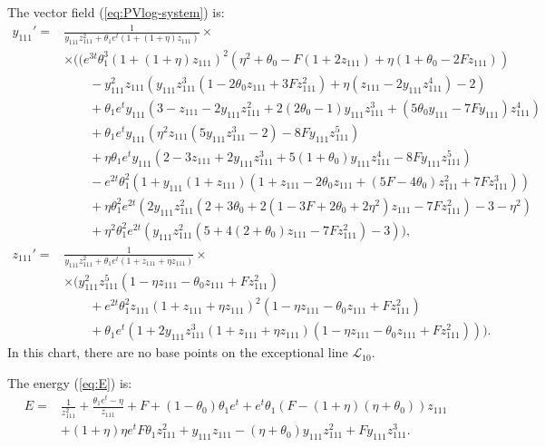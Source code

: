 The vector field  (\ref{eq:PVlog-system}) is:
$$
\begin{aligned}
y_{111}'=&\frac{1}{y_{111} z_{111}^2 + \theta_1 e^t (1 + (1+\eta) z_{111})}
\times
\\&
\times
\big(
(e^{3t} \theta_1^3 (1 + (1+\eta) z_{111})^2 (\eta^2 + \theta_0 - 
     F (1 + 2 z_{111}) + \eta (1 + \theta_0 - 2 F z_{111})) 
\\&
\qquad     
     - 
  y_{111}^2 z_{111} ( y_{111} z_{111}^3 (1 - 2 \theta_0 z_{111} + 3 F z_{111}^2) + 
     \eta (z_{111} - 2 y_{111} z_{111}^4)-2) 
 \\&
\qquad      
     + 
  \theta_1 e^t y_{111} (3 - z_{111} - 2 y_{111} z_{111}^2 
  + 
     2 (2 \theta_0-1) y_{111} z_{111}^3 + ( 5 \theta_0 y_{111}-7 F y_{111}) z_{111}^4)
\\&
 \qquad
+ \theta_1 e^t y_{111} (
         \eta^2 z_{111} (5 y_{111} z_{111}^3-2)  - 
     8 F y_{111} z_{111}^5)
\\&
 \qquad
+\eta \theta_1 e^t y_{111} (
     2 - 3 z_{111} + 2 y_{111} z_{111}^3 + 5 (1 + \theta_0) y_{111} z_{111}^4 - 
        8 F y_{111} z_{111}^5) 
\\&
 \qquad        
        -
  e^{2t} \theta_1^2 (1+ 
     y_{111} (1 + z_{111}) (1 + z_{111} - 
        2 \theta_0 z_{111} + (5 F - 4 \theta_0) z_{111}^2 + 7 F z_{111}^3))
\\&
 \qquad        
       +
 \eta  \theta_1^2 e^{2t}(
        2 y_{111} z_{111}^2 (2 + 3 \theta_0 + 2(1-3F+2 \theta_0+2\eta^2) z_{111} - 
           7 F z_{111}^2)-3-\eta^2)
 \\&
 \qquad        
       +
 \eta^2\theta_1^2 e^{2t}                   
      ( y_{111} z_{111}^2 (5 + 4 (2 + \theta_0) z_{111} - 7 F z_{111}^2)-3)
\big)
 ,\\
z_{111}'=&
\frac{1}{y_{111} z_{111}^2 + \theta_1 e^t (1 + z_{111} + \eta z_{111})}
\times
\\&
\times
\big(
y_{111}^2 z_{111}^5 (1 - \eta z_{111} - \theta_0 z_{111} + F z_{111}^2) 
\\
&
\qquad
+ 
 e^{2t} \theta_1^2 z_{111} (1 + z_{111} + \eta z_{111})^2 (1 - \eta z_{111} - 
    \theta_0 z_{111} + F z_{111}^2) 
\\
&
\qquad
        + 
 \theta_1 e^t (1 + 
    2 y_{111} z_{111}^3 (1 + z_{111} + \eta z_{111}) (1 - \eta z_{111} - \theta_0 z_{111} + 
       F z_{111}^2))
\big)
.
\end{aligned}
$$
In this chart, there are no base points on the exceptional line $\mathcal{L}_{10}$.

The energy (\ref{eq:E}) is:
$$
\begin{aligned}
E= &
\frac{1}{z_{111}^2}
+\frac{\theta_1 e^t-\eta}{z_{111}}
+F+(1-\theta_0) \theta_1e^t
+e^t \theta_1(F-(1+\eta)(\eta+\theta_0)) z_{111}
\\&
+(1+\eta)\eta e^tF \theta_1 z_{111}^2
+y_{111} z_{111}
-(\eta+ \theta_0) y_{111} z_{111}^2
+F y_{111} z_{111}^3
.
\end{aligned}
$$

